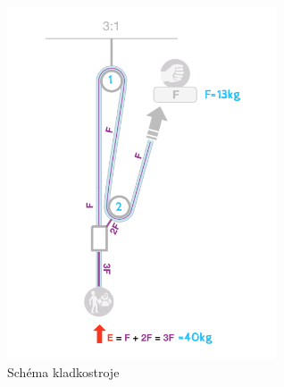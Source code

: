\begin{figure}[!hbt]
    \centering
    \includegraphics[width=8.0cm]{Figures/WebApplication/6_Web_application.png}
    \caption[6_Aplikace]{Schéma kladkostroje}
    \label{Obr:6_application}
\end{figure} 
